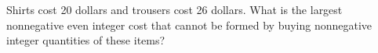 Shirts cost 20 dollars and trousers cost 26 dollars. What is the largest nonnegative even integer cost that cannot be formed by buying nonnegative integer quantities of these items?

